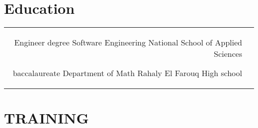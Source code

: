 \documentclass[10pt]{article} %
\begin{document}
\begin{paracol}{2}

\section{Education} 





\begin{supertabular}{rl} %

	
	
	{Engineer degree} %
	{Software Engineering} %
	{National School of Applied Sciences} %
	
	
	{baccalaureate} %
	{} %
	{Department of Math} %
	{Rahaly El Farouq High school} %
	

\end{supertabular}


\section{TRAINING}




\end{paracol}
\end{document}
